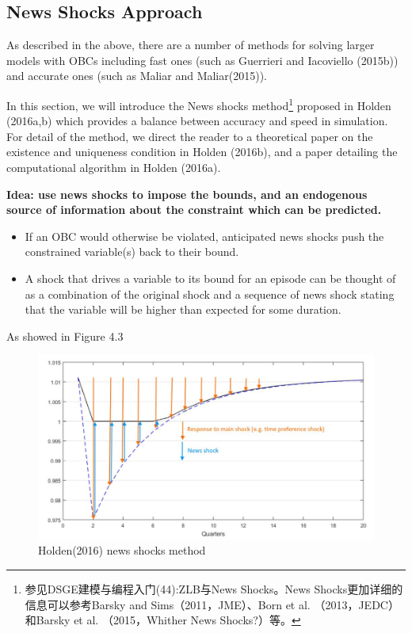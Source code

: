 \documentclass[10pt,math=newtx,citestyle=gb7714-2015,bibstyle=gb7714-2015]{elegantbook}
\begin{document}
{\begin{itemize}
\end{itemize}


\subsection{News Shocks Approach}

As described in the above, there are a number of methods for solving larger models with OBCs including fast ones (such as Guerrieri and Iacoviello (2015b)) and accurate ones (such as Maliar and Maliar(2015)).

In this section, we will introduce the News shocks method\footnote{参见DSGE建模与编程入门(44):ZLB与News Shocks。News Shocks更加详细的信息可以参考Barsky and Sims（2011，JME）、Born et al. （2013，JEDC）和Barsky et al. （2015，Whither News Shocks?）等。} proposed in Holden (2016a,b) which provides a balance between accuracy and speed in simulation. For detail of the method, we direct the reader to a theoretical paper on the existence and uniqueness condition in Holden (2016b), and a paper detailing the computational algorithm in Holden (2016a).

\textbf{Idea: use news shocks to impose the bounds, and an endogenous source of information about the constraint which can be predicted.}

\begin{itemize}
	\item If an OBC would otherwise be violated, anticipated news shocks push the constrained variable(s) back to their bound.
	\item A shock that drives a variable to its bound for an episode can be thought of as a combination of the original shock and a sequence of news shock stating that the variable will be higher than expected for some duration.
\end{itemize}

As showed in Figure 4.3

\begin{figure}[htbp!]
	\centering
	\includegraphics[width=0.8\linewidth]{FIG/newsshock}
	\caption{Holden(2016) news shocks method}\label{4.3}
	\centering
\end{figure}

}
\end{document}
